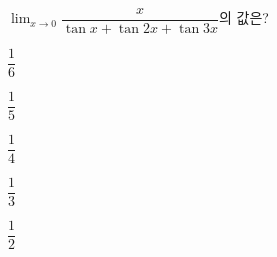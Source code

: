 $\displaystyle\lim_{x\to 0}\dfrac{x}{\tan x+\tan 2x+\tan 3x}$의 값은?
\begin{choices32}{\rule[-3ex]{0pt}{8ex}$\dfrac{1}{6}$}{\rule[-3ex]{0pt}{8ex}$\dfrac{1}{5}$}{\rule[-3ex]{0pt}{8ex}$\dfrac{1}{4}$}{\rule[-3ex]{0pt}{8ex}$\dfrac{1}{3}$}{\rule[-3ex]{0pt}{8ex}$\dfrac{1}{2}$}\end{choices32}
